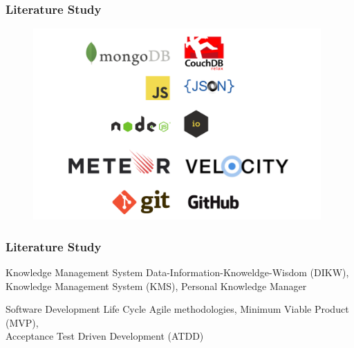 \documentclass[10pt, compress]{beamer}
\begin{document}

\begin{frame}
  \frametitle{Literature Study}

  \begin{figure}[ht]
    \vspace{-25pt}
    \centering
    \includegraphics[width=11cm]{include/literature-technologies.png}
    \label{fig:literature-technologies}
  \end{figure}

\end{frame}


\begin{frame}[fragile]
  \frametitle{Literature Study}

  \begin{block}{Knowledge Management System}
    Data-Information-Knoweldge-Wisdom (\alert{DIKW}),\\
    Knowledge Management System (\alert{KMS}), \alert{Personal Knowledge Manager}
  \end{block}

  \begin{block}{Software Development Life Cycle}
    \alert{Agile} methodologies, Minimum Viable Product (\alert{MVP}),\\
    Acceptance Test Driven Development (\alert{ATDD})
  \end{block}

\end{frame}

\end{document}
